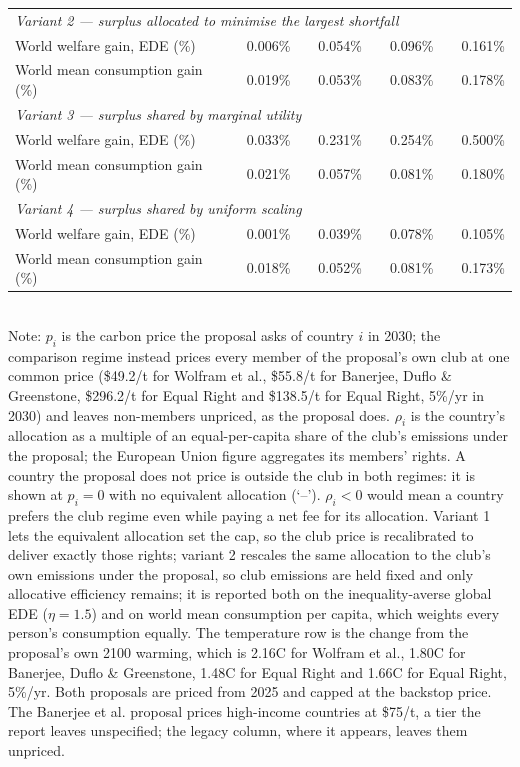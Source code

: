 \begin{table}[htbp]
\begin{tabular}{lcccccccc}
  \midrule
  \multicolumn{9}{l}{\textit{Variant 2 --- surplus allocated to minimise the largest shortfall}} \\
  \quad World welfare gain, EDE (\%) &  & 0.006\% &  & 0.054\% &  & 0.096\% &  & 0.161\% \\
  \quad World mean consumption gain (\%) &  & 0.019\% &  & 0.053\% &  & 0.083\% &  & 0.178\% \\
  \midrule
  \multicolumn{9}{l}{\textit{Variant 3 --- surplus shared by marginal utility}} \\
  \quad World welfare gain, EDE (\%) &  & 0.033\% &  & 0.231\% &  & 0.254\% &  & 0.500\% \\
  \quad World mean consumption gain (\%) &  & 0.021\% &  & 0.057\% &  & 0.081\% &  & 0.180\% \\
  \midrule
  \multicolumn{9}{l}{\textit{Variant 4 --- surplus shared by uniform scaling}} \\
  \quad World welfare gain, EDE (\%) &  & 0.001\% &  & 0.039\% &  & 0.078\% &  & 0.105\% \\
  \quad World mean consumption gain (\%) &  & 0.018\% &  & 0.052\% &  & 0.081\% &  & 0.173\% \\
  \bottomrule
\end{tabular}
\label{tab:equiv_rights_B}
\\[4pt]
{\footnotesize Note: $p_i$ is the carbon price the proposal asks of country $i$ in 2030; the comparison regime instead prices every member of the proposal's own club at one common price (\$49.2/t for Wolfram et al., \$55.8/t for Banerjee, Duflo \& Greenstone, \$296.2/t for Equal Right and \$138.5/t for Equal Right, 5\%/yr in 2030) and leaves non-members unpriced, as the proposal does. $\rho_i$ is the country's allocation as a multiple of an equal-per-capita share of the club's emissions under the proposal; the European Union figure aggregates its members' rights. A country the proposal does not price is outside the club in both regimes: it is shown at $p_i=0$ with no equivalent allocation (`--'). $\rho_i < 0$ would mean a country prefers the club regime even while paying a net fee for its allocation. Variant 1 lets the equivalent allocation set the cap, so the club price is recalibrated to deliver exactly those rights; variant 2 rescales the same allocation to the club's own emissions under the proposal, so club emissions are held fixed and only allocative efficiency remains; it is reported both on the inequality-averse global EDE ($\eta=1.5$) and on world mean consumption per capita, which weights every person's consumption equally. The temperature row is the change from the proposal's own 2100 warming, which is 2.16\textdegree{}C for Wolfram et al., 1.80\textdegree{}C for Banerjee, Duflo \& Greenstone, 1.48\textdegree{}C for Equal Right and 1.66\textdegree{}C for Equal Right, 5\%/yr. Both proposals are priced from 2025 and capped at the backstop price. The Banerjee et al. proposal prices high-income countries at \$75/t, a tier the report leaves unspecified; the legacy column, where it appears, leaves them unpriced.}
\end{table}
